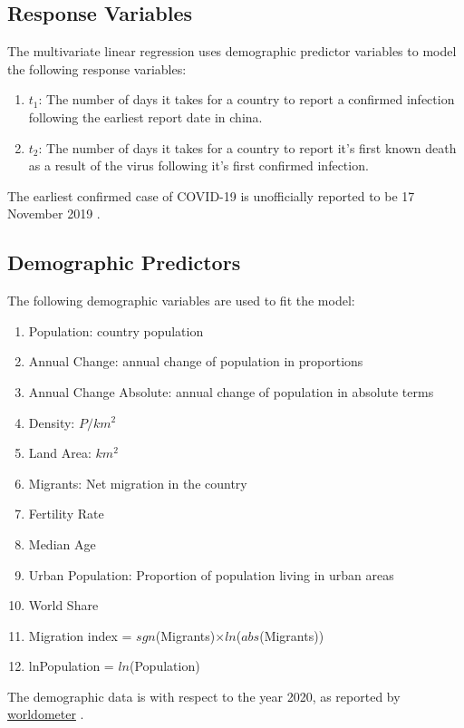 \documentclass[]{report}
\begin{document}
\subsection{Response Variables}

The multivariate linear regression uses demographic predictor variables to model the following response variables:


\begin{enumerate}
	\item $t_1$: The number of days it takes for a country to report a confirmed infection following the earliest report date in china.
	\item $t_2$: The number of days it takes for a country to report it's first known death as a result of the virus following it's first confirmed infection.
\end{enumerate}

The earliest confirmed case  of COVID-19 is  unofficially reported to be 17 November 2019 \cite{scmp}.

\subsection{Demographic Predictors}
The following demographic variables are used to fit the model:

\begin{enumerate}
	\item Population: country population
	\item Annual Change: annual change of population in proportions
	\item Annual Change Absolute: annual change of population in absolute terms 
	\item Density: $P/km^2$
	\item Land Area: $km^2$
	\item Migrants: Net migration in the country
	\item Fertility Rate
	\item Median Age
	\item Urban Population: Proportion of population living in urban areas
	\item World Share
	\item Migration index =  $sgn$(Migrants)$\times ln$($abs$(Migrants))
	\item lnPopulation = $ln$(Population)
\end{enumerate}

The demographic data is with respect to the year 2020, as reported by \href{https://www.worldometers.info/world-population/population-by-country/}{worldometer} \cite{worldometer}.
\end{document}
